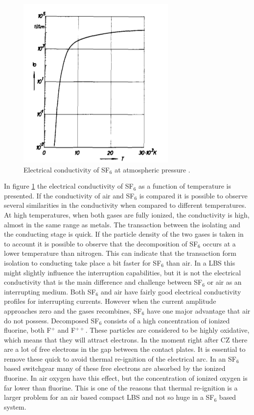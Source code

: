 \documentclass[10pt,a4paper]{article} %
\begin{document}
\begin{figure}[H]
\centering
\includegraphics[scale=0.5]{Bilder/Theory/SF6Conduct.png}
\caption{Electrical conductivity of SF$_6$ at atmospheric pressure \cite{bib:IPSF6AQM}.} \label{fig:condSF6}
\end{figure}

In figure \ref{fig:condSF6} the electrical conductivity of SF$_6$ as a function of temperature is presented. If the conductivity of air and SF$_6$ is compared it is possible to observe several similarities in the conductivity when compared to different temperatures. At high temperatures, when both gases are fully ionized, the conductivity is high, almost in the same range as metals. The transaction between the isolating and the conducting stage is quick. If the particle density of the two gases is taken in to account it is possible to observe that the decomposition of SF$_6$ occurs at a lower temperature than nitrogen. This can indicate that the transaction form isolation to conducting take place a bit faster for SF$_6$ than air. In a LBS this might slightly influence the interruption capabilities, but it is not the electrical conductivity that is the main difference and challenge between SF$_6$ or air as an interrupting medium. Both SF$_6$ and air have fairly good electrical conductivity profiles for interrupting currents.
However when the current amplitude approaches zero and the gases recombines, SF$_6$ have one major advantage that air do not possess. Decomposed SF$_6$ consists of a high concentration of ionized fluorine, both F$^{+}$ and F$^{++}$. These particles are considered to be highly oxidative, which means that they will attract electrons. In the moment right after CZ there are a lot of free electrons in the gap between the contact plates. It is essential to remove these quick to avoid thermal re-ignition of the electrical arc. In an SF$_6$ based switchgear many of these free electrons are absorbed by the ionized fluorine. In air oxygen have this effect, but the concentration of ionized oxygen is far lower than fluorine. This is one of the reasons that thermal re-ignition is a larger problem for an air based compact LBS and not so huge in a SF$_6$ based system.
   
\end{document}

